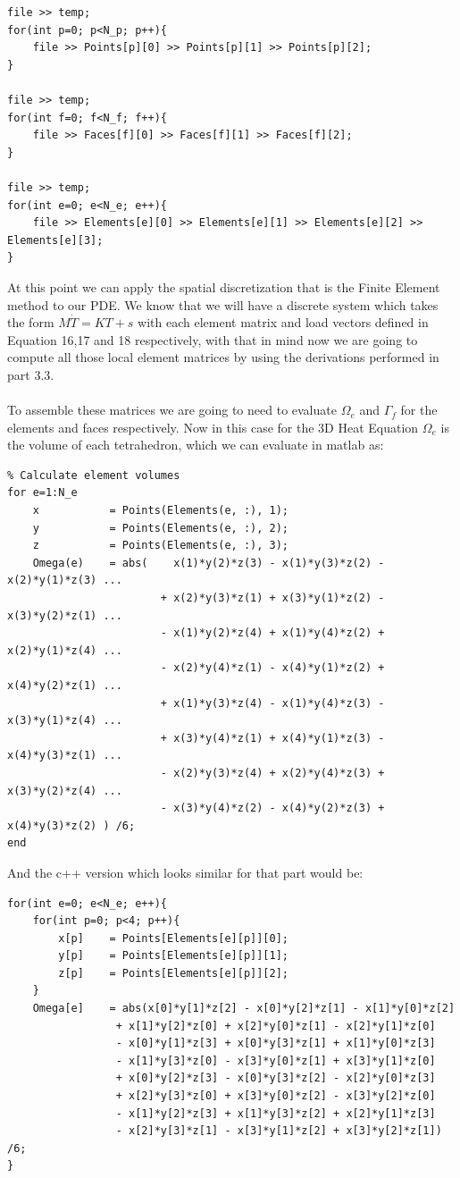 \documentclass[12pt]{article}
\begin{document}
\begin{lstlisting}[style=MyC++Style]
file >> temp;
for(int p=0; p<N_p; p++){
	file >> Points[p][0] >> Points[p][1] >> Points[p][2];
}

file >> temp;
for(int f=0; f<N_f; f++){
	file >> Faces[f][0] >> Faces[f][1] >> Faces[f][2];
}

file >> temp;
for(int e=0; e<N_e; e++){
	file >> Elements[e][0] >> Elements[e][1] >> Elements[e][2] >> Elements[e][3];
}
\end{lstlisting}

At this point we can apply the spatial discretization that is the Finite Element method to our PDE. We know that we will have a discrete system which takes the form $M\dot{T} = KT + s$ with each element matrix and load vectors defined in Equation 16,17 and 18 respectively, with that in mind now we are going to compute all those local element matrices by using the derivations performed in part 3.3.
\\\\
To assemble these matrices we are going to need to evaluate $\Omega_e$ and $\Gamma_f$ for the elements and faces respectively. Now in this case for the 3D Heat Equation $\Omega_e$ is the volume of each tetrahedron, which we can evaluate in matlab as:

\begin{lstlisting}
% Calculate element volumes
for e=1:N_e	
	x           = Points(Elements(e, :), 1);
	y           = Points(Elements(e, :), 2);
	z           = Points(Elements(e, :), 3);
	Omega(e)	= abs(    x(1)*y(2)*z(3) - x(1)*y(3)*z(2) - x(2)*y(1)*z(3) ...
						+ x(2)*y(3)*z(1) + x(3)*y(1)*z(2) - x(3)*y(2)*z(1) ...
						- x(1)*y(2)*z(4) + x(1)*y(4)*z(2) + x(2)*y(1)*z(4) ...
						- x(2)*y(4)*z(1) - x(4)*y(1)*z(2) + x(4)*y(2)*z(1) ...
						+ x(1)*y(3)*z(4) - x(1)*y(4)*z(3) - x(3)*y(1)*z(4) ...
						+ x(3)*y(4)*z(1) + x(4)*y(1)*z(3) - x(4)*y(3)*z(1) ...
						- x(2)*y(3)*z(4) + x(2)*y(4)*z(3) + x(3)*y(2)*z(4) ...
						- x(3)*y(4)*z(2) - x(4)*y(2)*z(3) + x(4)*y(3)*z(2) ) /6;
end
\end{lstlisting}

And the c++ version which looks similar for that part would be:

\begin{lstlisting}[style=MyC++Style]
for(int e=0; e<N_e; e++){
	for(int p=0; p<4; p++){
		x[p]	= Points[Elements[e][p]][0];
		y[p]	= Points[Elements[e][p]][1];
		z[p]	= Points[Elements[e][p]][2];
	}
	Omega[e]    = abs(x[0]*y[1]*z[2] - x[0]*y[2]*z[1] - x[1]*y[0]*z[2]
				 + x[1]*y[2]*z[0] + x[2]*y[0]*z[1] - x[2]*y[1]*z[0]
				 - x[0]*y[1]*z[3] + x[0]*y[3]*z[1] + x[1]*y[0]*z[3]
				 - x[1]*y[3]*z[0] - x[3]*y[0]*z[1] + x[3]*y[1]*z[0]
				 + x[0]*y[2]*z[3] - x[0]*y[3]*z[2] - x[2]*y[0]*z[3]
				 + x[2]*y[3]*z[0] + x[3]*y[0]*z[2] - x[3]*y[2]*z[0]
				 - x[1]*y[2]*z[3] + x[1]*y[3]*z[2] + x[2]*y[1]*z[3]
				 - x[2]*y[3]*z[1] - x[3]*y[1]*z[2] + x[3]*y[2]*z[1]) /6;
}
\end{lstlisting}
\end{document}
